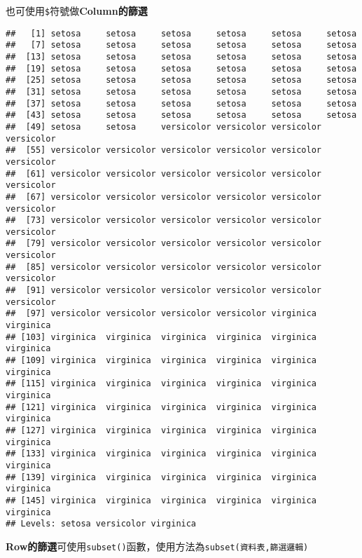 \documentclass[]{book}
\newenvironment{Shaded}{\begin{snugshade}}{\end{snugshade}}
\newcommand{\NormalTok}[1]{{#1}}
\begin{document}
也可使用\texttt{\$}符號做\textbf{Column的篩選}

\begin{Shaded}
\end{Shaded}

\begin{verbatim}
##   [1] setosa     setosa     setosa     setosa     setosa     setosa    
##   [7] setosa     setosa     setosa     setosa     setosa     setosa    
##  [13] setosa     setosa     setosa     setosa     setosa     setosa    
##  [19] setosa     setosa     setosa     setosa     setosa     setosa    
##  [25] setosa     setosa     setosa     setosa     setosa     setosa    
##  [31] setosa     setosa     setosa     setosa     setosa     setosa    
##  [37] setosa     setosa     setosa     setosa     setosa     setosa    
##  [43] setosa     setosa     setosa     setosa     setosa     setosa    
##  [49] setosa     setosa     versicolor versicolor versicolor versicolor
##  [55] versicolor versicolor versicolor versicolor versicolor versicolor
##  [61] versicolor versicolor versicolor versicolor versicolor versicolor
##  [67] versicolor versicolor versicolor versicolor versicolor versicolor
##  [73] versicolor versicolor versicolor versicolor versicolor versicolor
##  [79] versicolor versicolor versicolor versicolor versicolor versicolor
##  [85] versicolor versicolor versicolor versicolor versicolor versicolor
##  [91] versicolor versicolor versicolor versicolor versicolor versicolor
##  [97] versicolor versicolor versicolor versicolor virginica  virginica 
## [103] virginica  virginica  virginica  virginica  virginica  virginica 
## [109] virginica  virginica  virginica  virginica  virginica  virginica 
## [115] virginica  virginica  virginica  virginica  virginica  virginica 
## [121] virginica  virginica  virginica  virginica  virginica  virginica 
## [127] virginica  virginica  virginica  virginica  virginica  virginica 
## [133] virginica  virginica  virginica  virginica  virginica  virginica 
## [139] virginica  virginica  virginica  virginica  virginica  virginica 
## [145] virginica  virginica  virginica  virginica  virginica  virginica 
## Levels: setosa versicolor virginica
\end{verbatim}

\textbf{Row的篩選}可使用\texttt{subset()}函數，使用方法為\texttt{subset(資料表,篩選邏輯)}
\end{document}
